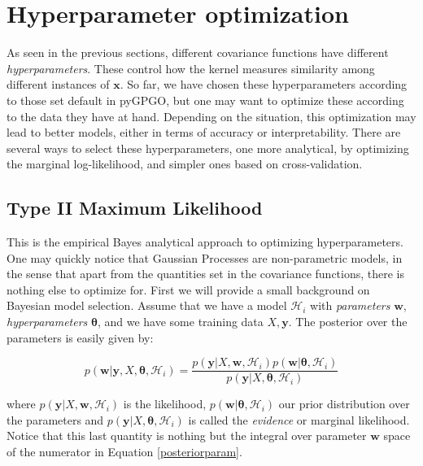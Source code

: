 \documentclass[10pt,a4paper,twoside]{book}
\begin{document}
\section{Hyperparameter optimization}
\label{hyper}

As seen in the previous sections, different covariance functions have different \textit{hyperparameters}. These control how the kernel measures similarity among different instances of $\boldsymbol{x}$. So far, we have chosen these hyperparameters according to those set default in pyGPGO, but one may want to optimize these according to the data they have at hand. Depending on the situation, this optimization may lead to better models, either in terms of accuracy or interpretability. There are several ways to select these hyperparameters, one more analytical, by optimizing the marginal log-likelihood, and simpler ones based on cross-validation.

\subsection{Type II Maximum Likelihood}
\label{empbayes}

This is the empirical Bayes analytical approach to optimizing hyperparameters. One may quickly notice that Gaussian Processes are non-parametric models, in the sense that apart from the quantities set in the covariance functions, there is nothing else to optimize for. First we will provide a small background on Bayesian model selection. Assume that we have a model  $\mathcal{H}_i$ with \textit{parameters} $\boldsymbol{w}$, \textit{hyperparameters} $\boldsymbol{\theta}$, and we have some training data $X, \boldsymbol{y}$. The posterior over the parameters is easily given by:

\begin{equation}
\label{posteriorparam}
p(\boldsymbol{w}|\boldsymbol{y}, X, \boldsymbol{\theta}, \mathcal{H}_i) = \dfrac{p(\boldsymbol{y}|X, \boldsymbol{w}, \mathcal{H}_i)p(\boldsymbol{w}|\boldsymbol{\theta}, \mathcal{H}_i)}{p(\boldsymbol{y}|X, \boldsymbol{\theta}, \mathcal{H}_i)}
\end{equation}

where $p(\boldsymbol{y}|X, \boldsymbol{w}, \mathcal{H}_i)$ is the likelihood, $p(\boldsymbol{w}|\boldsymbol{\theta}, \mathcal{H}_i)$ our prior distribution over the parameters and $p(\boldsymbol{y}|X, \boldsymbol{\theta}, \mathcal{H}_i)$ is called the \textit{evidence} or marginal likelihood. Notice that this last quantity is nothing but the integral over parameter $\boldsymbol{w}$ space of the numerator in Equation \ref{posteriorparam}.\\
\end{document}
